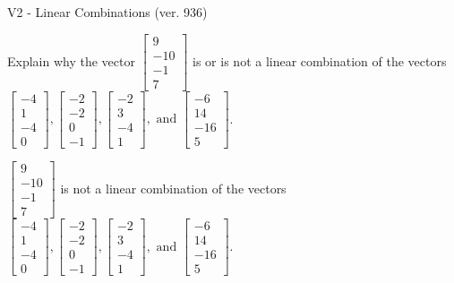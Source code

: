 \begin{exercise}
  \begin{exerciseTitle}V2 - Linear Combinations (ver. 936)\end{exerciseTitle}
  \begin{exerciseStatement}
    Explain why the vector \(\left[\begin{array}{c}
9 \\
-10 \\
-1 \\
7
\end{array}\right]\)  is or is not a linear 
	combination of the vectors \(\left[\begin{array}{c}
-4 \\
1 \\
-4 \\
0
\end{array}\right] , \left[\begin{array}{c}
-2 \\
-2 \\
0 \\
-1
\end{array}\right] , \left[\begin{array}{c}
-2 \\
3 \\
-4 \\
1
\end{array}\right] , \text{ and } \left[\begin{array}{c}
-6 \\
14 \\
-16 \\
5
\end{array}\right]\).
	


  \end{exerciseStatement}
  \begin{exerciseAnswer}
   \(\left[\begin{array}{c}
9 \\
-10 \\
-1 \\
7
\end{array}\right]\) 
  	 is not  
	a linear combination of the vectors \(\left[\begin{array}{c}
-4 \\
1 \\
-4 \\
0
\end{array}\right] , \left[\begin{array}{c}
-2 \\
-2 \\
0 \\
-1
\end{array}\right] , \left[\begin{array}{c}
-2 \\
3 \\
-4 \\
1
\end{array}\right] , \text{ and } \left[\begin{array}{c}
-6 \\
14 \\
-16 \\
5
\end{array}\right]\).


\end{exerciseAnswer}
\end{exercise}
